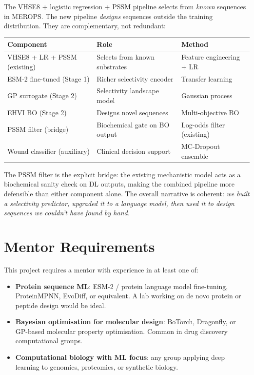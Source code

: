\documentclass[10pt,a4paper]{article}
\begin{document}
The VHSE8 + logistic regression + PSSM pipeline selects from \emph{known}
sequences in MEROPS.  The new pipeline \emph{designs} sequences outside the
training distribution.  They are complementary, not redundant:

\medskip
\begin{center}
\small
\begin{tabular}{lll}
  \toprule
  Component & Role & Method\\
  \midrule
  VHSE8 + LR + PSSM (existing) & Selects from known substrates & Feature engineering + LR\\
  ESM-2 fine-tuned (Stage 1)   & Richer selectivity encoder     & Transfer learning\\
  GP surrogate (Stage 2)        & Selectivity landscape model    & Gaussian process\\
  EHVI BO (Stage 2)             & Designs novel sequences        & Multi-objective BO\\
  PSSM filter (bridge)          & Biochemical gate on BO output  & Log-odds filter (existing)\\
  Wound classifier (auxiliary)  & Clinical decision support      & MC-Dropout ensemble\\
  \bottomrule
\end{tabular}
\end{center}

\medskip
The PSSM filter is the explicit bridge: the existing mechanistic model
acts as a biochemical sanity check on DL outputs, making the combined
pipeline more defensible than either component alone.  The overall
narrative is coherent: \emph{we built a selectivity predictor, upgraded
it to a language model, then used it to design sequences we couldn't
have found by hand.}

\section{Mentor Requirements}

This project requires a mentor with experience in at least one of:

\begin{itemize}[topsep=2pt,itemsep=2pt,leftmargin=*]
  \item \textbf{Protein sequence ML}: ESM-2 / protein language model fine-tuning,
    ProteinMPNN, EvoDiff, or equivalent.  A lab working on de novo protein
    or peptide design would be ideal.
  \item \textbf{Bayesian optimisation for molecular design}: BoTorch, Dragonfly,
    or GP-based molecular property optimisation.  Common in drug discovery
    computational groups.
  \item \textbf{Computational biology with ML focus}: any group applying deep
    learning to genomics, proteomics, or synthetic biology.
\end{itemize}
\end{document}
